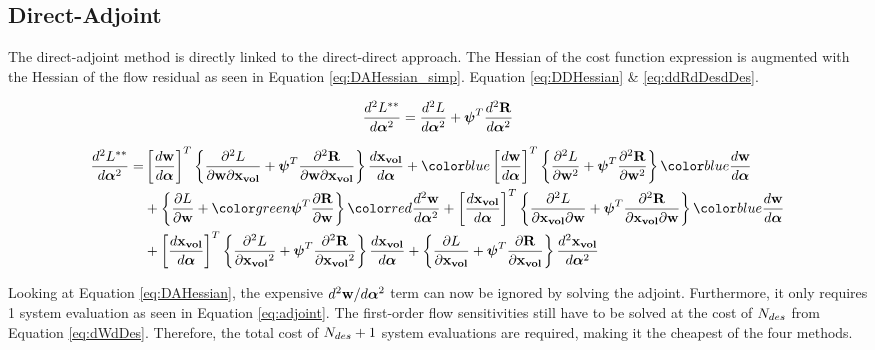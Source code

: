 \documentclass[letterpaper,12pt,]{article}
\begin{document}
\newpage
\subsection*{Direct-Adjoint}

The direct-adjoint method is directly linked to the direct-direct approach.
The Hessian of the cost function expression is augmented with the Hessian of the flow residual as seen in Equation \ref{eq:DAHessian_simp}.
Equation \ref{eq:DDHessian} \& \ref{eq:ddRdDesdDes}.

\begin{equation}
\begin{split}
	\dfrac{d^2L^{**}}{d\boldsymbol{\alpha}^2} 
	=
	\dfrac{d^2L}{d\boldsymbol{\alpha}^2} 
	+
	\boldsymbol{\psi}^T
	\dfrac{d^2\mathbf{R}}{d\boldsymbol{\alpha}^2} 
\label{eq:DAHessian_simp}
\end{split}
\end{equation}

\begin{equation}
\begin{split}
	\DDt{L^{**}}{\balfa} 
	=&
	\trans{\Dt{\bw}{\balfa}}
	\left\{
		\ddelm{L}{\bw}{\xvol}
		+
		\bpsi^T
		\ddelm{\bR}{\bw}{\xvol}
	\right\}
	\Dt{\xvol}{\balfa}
	+
	\blue{\trans{\Dt{\bw}{\balfa}}}
	\left\{
		\ddel{L}{\bw}
		+
		\bpsi^T
		\ddel{\bR}{\bw}
	\right\}
	\blue{\Dt{\bw}{\balfa}}
	\\&+
	\left\{
		\del{L}{\bw}
		+
		\green{\bpsi^T}
		\del{\bR}{\bw}
	\right\}
	\red{\DDt{\bw}{\balfa}}
	+
	\trans{\Dt{\xvol}{\balfa}}
	\left\{
		\ddelm{L}{\xvol}{\bw}
		+
		\bpsi^T
		\ddelm{\bR}{\xvol}{\bw}
	\right\}
	\blue{\Dt{\bw}{\balfa}}
	\\&+
	\trans{\Dt{\xvol}{\balfa}}
	\left\{
		\ddel{L}{\xvol}
		+
		\bpsi^T
		\ddel{\bR}{\xvol}
	\right\}
	\Dt{\xvol}{\balfa}
	+
	\left\{
		\del{L}{\xvol}
		+
		\bpsi^T
		\del{\bR}{\xvol}
	\right\}
	\DDt{\xvol}{\balfa}
\label{eq:DAHessian}
\end{split}
\end{equation}

Looking at Equation \ref{eq:DAHessian}, the expensive $d^2\mathbf{w}/d\boldsymbol{\alpha}^2$ term can now be ignored by solving the adjoint.
Furthermore, it only requires 1 system evaluation as seen in Equation \ref{eq:adjoint}.
The first-order flow sensitivities still have to be solved at the cost of $N_{des}$ from Equation \ref{eq:dWdDes}.
Therefore, the total cost of $N_{des} + 1$ system evaluations are required, making it the cheapest of the four methods.
\end{document}
